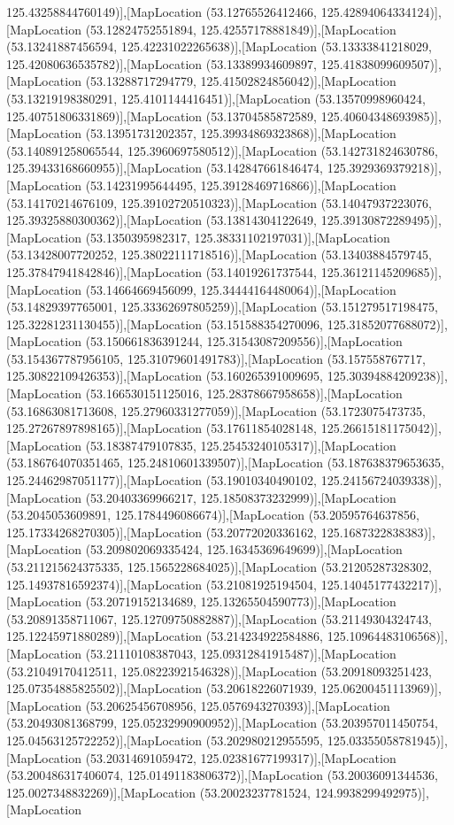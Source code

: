 125.43258844760149)],[MapLocation (53.12765526412466, 125.42894064334124)],[MapLocation (53.12824752551894, 125.42557178881849)],[MapLocation (53.13241887456594, 125.42231022265638)],[MapLocation (53.13333841218029, 125.42080636535782)],[MapLocation (53.13389934609897, 125.41838099609507)],[MapLocation (53.13288717294779, 125.41502824856042)],[MapLocation (53.13219198380291, 125.4101144416451)],[MapLocation (53.13570998960424, 125.40751806331869)],[MapLocation (53.13704585872589, 125.40604348693985)],[MapLocation (53.13951731202357, 125.39934869323868)],[MapLocation (53.140891258065544, 125.3960697580512)],[MapLocation (53.142731824630786, 125.39433168660955)],[MapLocation (53.142847661846474, 125.3929369379218)],[MapLocation (53.14231995644495, 125.39128469716866)],[MapLocation (53.14170214676109, 125.39102720510323)],[MapLocation (53.14047937223076, 125.39325880300362)],[MapLocation (53.13814304122649, 125.39130872289495)],[MapLocation (53.1350395982317, 125.38331102197031)],[MapLocation (53.13428007720252, 125.38022111718516)],[MapLocation (53.13403884579745, 125.37847941842846)],[MapLocation (53.14019261737544, 125.36121145209685)],[MapLocation (53.14664669456099, 125.34444164480064)],[MapLocation (53.14829397765001, 125.33362697805259)],[MapLocation (53.151279517198475, 125.32281231130455)],[MapLocation (53.151588354270096, 125.31852077688072)],[MapLocation (53.150661836391244, 125.31543087209556)],[MapLocation (53.154367787956105, 125.31079601491783)],[MapLocation (53.157558767717, 125.30822109426353)],[MapLocation (53.160265391009695, 125.30394884209238)],[MapLocation (53.166530151125016, 125.28378667958658)],[MapLocation (53.16863081713608, 125.27960331277059)],[MapLocation (53.1723075473735, 125.27267897898165)],[MapLocation (53.17611854028148, 125.26615181175042)],[MapLocation (53.18387479107835, 125.25453240105317)],[MapLocation (53.186764070351465, 125.24810601339507)],[MapLocation (53.187638379653635, 125.24462987051177)],[MapLocation (53.19010340490102, 125.24156724039338)],[MapLocation (53.20403369966217, 125.18508373232999)],[MapLocation (53.2045053609891, 125.1784496086674)],[MapLocation (53.20595764637856, 125.17334268270305)],[MapLocation (53.20772020336162, 125.1687322838383)],[MapLocation (53.209802069335424, 125.16345369649699)],[MapLocation (53.211215624375335, 125.1565228684025)],[MapLocation (53.21205287328302, 125.14937816592374)],[MapLocation (53.21081925194504, 125.14045177432217)],[MapLocation (53.20719152134689, 125.13265504590773)],[MapLocation (53.20891358711067, 125.12709750882887)],[MapLocation (53.21149304324743, 125.12245971880289)],[MapLocation (53.214234922584886, 125.10964483106568)],[MapLocation (53.21110108387043, 125.09312841915487)],[MapLocation (53.21049170412511, 125.08223921546328)],[MapLocation (53.20918093251423, 125.07354885825502)],[MapLocation (53.20618226071939, 125.06200451113969)],[MapLocation (53.20625456708956, 125.0576943270393)],[MapLocation (53.20493081368799, 125.05232990900952)],[MapLocation (53.203957011450754, 125.04563125722252)],[MapLocation (53.202980212955595, 125.03355058781945)],[MapLocation (53.20314691059472, 125.02381677199317)],[MapLocation (53.200486317406074, 125.01491183806372)],[MapLocation (53.20036091344536, 125.0027348832269)],[MapLocation (53.20023237781524, 124.9938299492975)],[MapLocation 